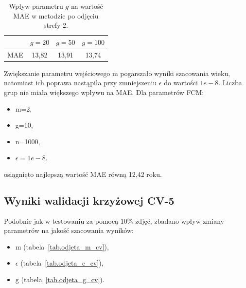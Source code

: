 \documentclass[a4paper,twoside,12pt]{book}
\begin{document}
    \begin{table}[]
        \centering
        \caption{Wpływ parametru $g$ na wartość MAE w metodzie po odjęciu strefy 2.}
        \begin{tabular}{|c|c|c|c|}
            \hline
            & $g=20$ & $g=50$ & $g=100$ \\ \hline
            MAE & 13,82 & 13,91 & 13,74 \\ \hline
        \end{tabular}
        \label{tab.odjeta_g}
    \end{table}

    Zwiększanie parametru wejściowego m pogarszało wyniki szacowania wieku, natomiast ich poprawa nastąpiła przy
    zmniejszeniu $\epsilon$ do wartości $1e-8$. Liczba grup nie miała większego wpływu na MAE.
    Dla parametrów FCM:
    \begin{itemize}
        \item m=2,
        \item g=10,
        \item n=1000,
        \item $\epsilon=1e-8$.
    \end{itemize}
    osiągnięto najlepszą wartość MAE równą 12,42 roku.

    \subsection*{Wyniki walidacji krzyżowej CV-5}

    Podobnie jak w testowaniu za pomocą 10\% zdjęć, zbadano wpływ zmiany parametrów na jakość szacowania wyników:
    \begin{itemize}
        \item m (tabela~\ref{tab.odjeta_m_cv}),
        \item $\epsilon$ (tabela~\ref{tab.odjeta_e_cv}),
        \item g (tabela~\ref{tab.odjeta_g_cv}).
    \end{itemize}
\end{document}
